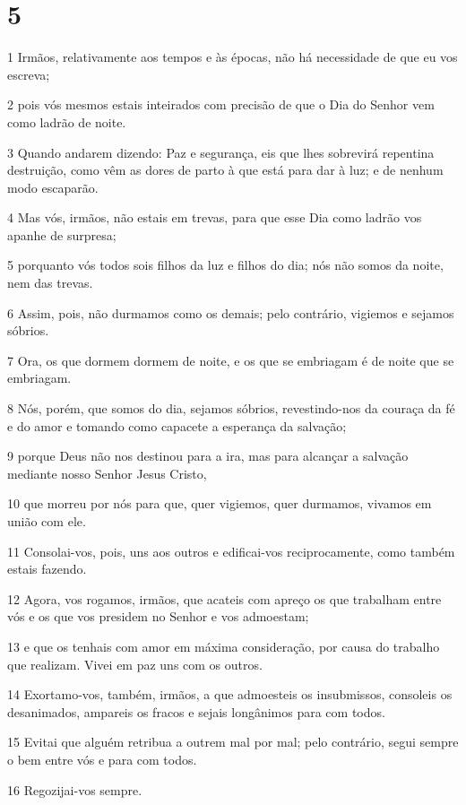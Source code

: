 \chapter{5}

\par 1 Irmãos, relativamente aos tempos e às épocas, não há necessidade de que eu vos escreva;
\par 2 pois vós mesmos estais inteirados com precisão de que o Dia do Senhor vem como ladrão de noite.
\par 3 Quando andarem dizendo: Paz e segurança, eis que lhes sobrevirá repentina destruição, como vêm as dores de parto à que está para dar à luz; e de nenhum modo escaparão.
\par 4 Mas vós, irmãos, não estais em trevas, para que esse Dia como ladrão vos apanhe de surpresa;
\par 5 porquanto vós todos sois filhos da luz e filhos do dia; nós não somos da noite, nem das trevas.
\par 6 Assim, pois, não durmamos como os demais; pelo contrário, vigiemos e sejamos sóbrios.
\par 7 Ora, os que dormem dormem de noite, e os que se embriagam é de noite que se embriagam.
\par 8 Nós, porém, que somos do dia, sejamos sóbrios, revestindo-nos da couraça da fé e do amor e tomando como capacete a esperança da salvação;
\par 9 porque Deus não nos destinou para a ira, mas para alcançar a salvação mediante nosso Senhor Jesus Cristo,
\par 10 que morreu por nós para que, quer vigiemos, quer durmamos, vivamos em união com ele.
\par 11 Consolai-vos, pois, uns aos outros e edificai-vos reciprocamente, como também estais fazendo.
\par 12 Agora, vos rogamos, irmãos, que acateis com apreço os que trabalham entre vós e os que vos presidem no Senhor e vos admoestam;
\par 13 e que os tenhais com amor em máxima consideração, por causa do trabalho que realizam. Vivei em paz uns com os outros.
\par 14 Exortamo-vos, também, irmãos, a que admoesteis os insubmissos, consoleis os desanimados, ampareis os fracos e sejais longânimos para com todos.
\par 15 Evitai que alguém retribua a outrem mal por mal; pelo contrário, segui sempre o bem entre vós e para com todos.
\par 16 Regozijai-vos sempre.
